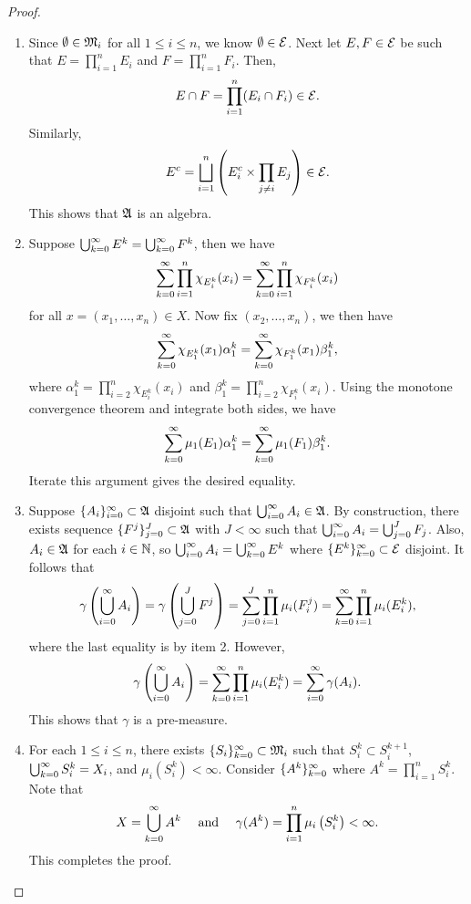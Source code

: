 \documentclass[a4paper]{article}
\begin{document}
\begin{proof}
\begin{enumerate}
\item Since $\emptyset \in \mathfrak{M}_i$ for all $1 \leq i \leq n$,
we know $\emptyset \in \mathcal{E}$. Next let $E, F \in \mathcal{E}$ be 
such that $E = \prod_{i=1}^n E_i$ and $F = \prod_{i=1}^n 
F_i$. Then,
\[
E \cap F = \prod_{i=1}^n (E_i \cap F_i) \in \mathcal{E}.
\]
Similarly, 
\[
E^c = \bigsqcup_{i=1}^n \left( E_i^c 
\times \prod_{j \neq i} E_j \right) \in \mathcal{E}.
\]
This shows that $\mathfrak{A}$ is an algebra.

\item Suppose $\bigcup_{k=0}^\infty E^k = \bigcup_{k=0}^\infty F^k$, then we have 
\[
\sum_{k=0}^\infty \prod_{i=1}^n \chi_{E_i^k}(x_i) 
= \sum_{k=0}^\infty \prod_{i=1}^n \chi_{F_i^k}(x_i)
\]
for all $x = (x_1, \dots, x_n) \in X$. 
Now fix $(x_2, \dots, x_n)$, we then have 
\[
\sum_{k=0}^\infty \chi_{E^k_1}(x_1) \alpha_1^k 
= \sum_{k=0}^\infty \chi_{F^k_1}(x_1) \beta_1^k, 
\]
where 
$\alpha_1^k = \prod_{i=2}^n \chi_{E_i^k} (x_i)$ and 
$\beta_1^k = \prod_{i=2}^n \chi_{F_i^k} (x_i)$.
Using the monotone convergence theorem and integrate 
both sides, we have 
\[
\sum_{k=0}^\infty \mu_1(E_1) \alpha_1^k 
= \sum_{k=0}^\infty \mu_1(F_1) \beta_1^k.
\]
Iterate this argument gives the desired equality.

\item Suppose $\{ A_i \}_{i=0}^\infty \subset \mathfrak{A}$ disjoint such that 
$\bigcup_{i=0}^\infty A_i \in \mathfrak{A}$. By construction, there exists 
sequence $\{ F^j \}_{j=0}^J \subset \mathfrak{A}$ with $J < \infty$ such that 
$\bigcup_{i=0}^\infty{A_i} = \bigcup_{j=0}^J F_j$. Also, $A_i \in \mathfrak{A}$ 
for each $i \in \mathbb{N}$, so $\bigcup_{i=0}^\infty A_i = \bigcup_{k=0}^\infty E^k$
where $\{ E^k \}_{k=0}^\infty \subset \mathcal{E}$ disjoint.
It follows that 
\[
\gamma \left( \bigcup_{i=0}^\infty A_i \right)
= \gamma \left( \bigcup_{j=0}^J F^j \right)
= \sum_{j=0}^J \prod_{i=1}^n \mu_i ( F_i^j )
= \sum_{k=0}^\infty \prod_{i=1}^n \mu_i (E_i^k),
\]
where the last equality is by item 2. However, 
\[
\gamma \left( \bigcup_{i=0}^\infty A_i \right) 
= \sum_{k=0}^\infty \prod_{i=1}^n \mu_i (E_i^k) 
= \sum_{i=0}^\infty \gamma (A_i).
\]
This shows that $\gamma$ is a pre-measure.

\item For each $1 \leq i \leq n$, there exists 
$\{ S_i \}_{k=0}^\infty \subset \mathfrak{M}_i$ such that 
$S_i^k \subset S_i^{k+1}$, 
$\bigcup_{k=0}^\infty S_i^k = X_i$, and $\mu_i(S_i^k) < \infty$.
Consider $\{ A^k \}_{k=0}^\infty$ where $A^k = \prod_{i=1}^n S_i^k$.
Note that 
\[
X = \bigcup_{k=0}^\infty A^k \quad \text{ and } \quad 
\gamma(A^k) = \prod_{i=1}^n \mu_i \left( S_i^k \right) < \infty.
\]
This completes the proof.

\end{enumerate}
\end{proof}
\end{document}
